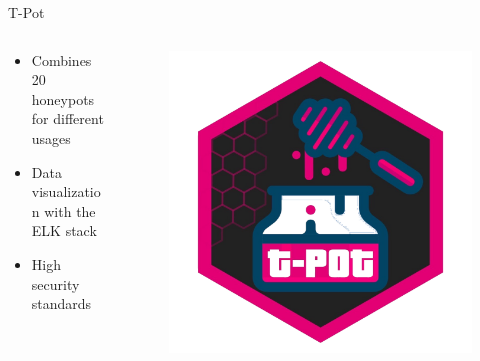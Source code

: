 \begin{frame}{T-Pot}
    \begin{columns}
        \begin{column}{0.5\textwidth}
            \begin{itemize}
                \item Combines 20 honeypots for different usages
                \item Data visualization with the ELK stack
                \item High security standards
            \end{itemize}
        \end{column}
        \begin{column}{0.5\textwidth}
            \begin{figure}
                \centering
                \includegraphics[width=\columnwidth]{img/tpot.png}
            \end{figure}
        \end{column}
    \end{columns}
\end{frame}